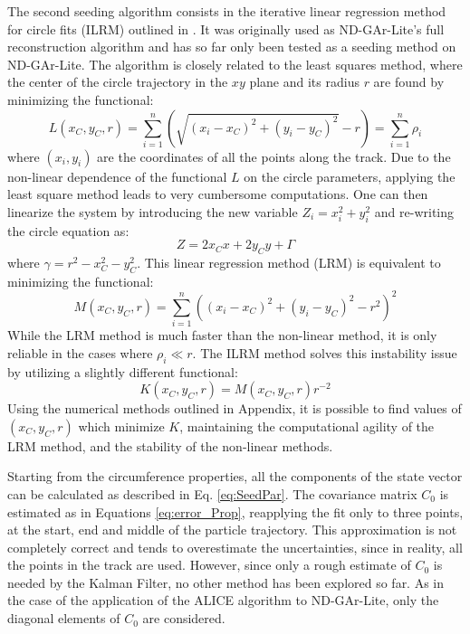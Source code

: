 The second seeding algorithm consists in the iterative linear regression method for circle fits (ILRM) outlined in \cite{ILRM}. It was originally used as ND-GAr-Lite's full reconstruction algorithm and has so far only been tested as a seeding method on ND-GAr-Lite. The algorithm is closely related to the least squares method, where the center of the circle trajectory in the $xy$ plane and its radius $r$ are found by minimizing the functional:
\begin{equation}
    L(x_C,y_C,r)=\sum_{i=1}^{n}(\sqrt{(x_i-x_C)^2+(y_i-y_C)^2}-r)=\sum_{i=1}^{n}\rho_i
\end{equation}
where $(x_i,y_i)$ are the coordinates of all the points along the track. Due to the non-linear dependence of the functional $L$ on the circle parameters, applying the least square method leads to very cumbersome computations. One can then linearize the system by introducing the new variable $Z_i=x_i^2+y_i^2$ and re-writing the circle equation as:
\begin{equation}
    Z = 2x_Cx+2y_Cy+\Gamma
\end{equation}
where $\gamma = r^2-x_C^2-y_C^2$. This linear regression method (LRM) is equivalent to minimizing the functional:
\begin{equation}
    M(x_C,y_C,r)=\sum_{i=1}^{n}((x_i-x_C)^2+(y_i-y_C)^2-r^2)^2
\end{equation}
While the LRM method is much faster than the non-linear method, it is only reliable in the cases where $\rho_i\ll r$. The ILRM method solves this instability issue by utilizing a slightly different functional:
\begin{equation}
    \label{eq:ILRMfunctional}
    K(x_C,y_C,r)=M(x_C,y_C,r)r^{-2}
\end{equation}
Using the numerical methods outlined in Appendix, it is possible to find values of $(x_C,y_C,r)$ which minimize $K$,  maintaining the computational agility of the LRM method, and the stability of the non-linear methods. 

Starting from the circumference properties, all the components of the state vector can be calculated as described in Eq. \ref{eq:SeedPar}. The covariance matrix $C_0$ is estimated as in Equations \ref{eq:error_Prop}, reapplying the fit only to three points, at the start, end and middle of the particle trajectory. This approximation is not completely correct and tends to overestimate the uncertainties, since in reality, all the points in the track are used. However, since only a rough estimate of $C_0$ is needed by the Kalman Filter, no other method has been explored so far. As in the case of the application of the ALICE algorithm to ND-GAr-Lite, only the diagonal elements of $C_0$ are considered.
